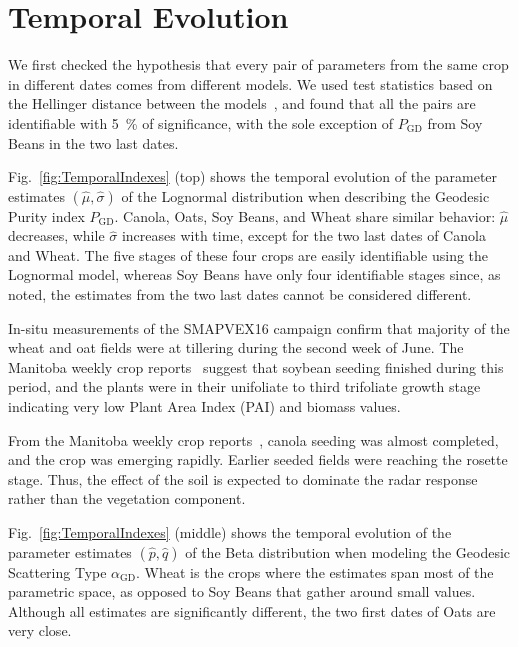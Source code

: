 \documentclass[journal]{IEEEtran}
\begin{document}
	\section{Temporal Evolution}
	
	We first checked the hypothesis that every pair of parameters from the same crop in different dates comes from different models.
	We used test statistics based on the Hellinger distance between the models~\cite{AnalyticExpressionsStochasticDistancesBetweenRelaxedComplexWishartDistributions}, and found that all the pairs are identifiable with \SI{5}{\percent} of significance, with the sole exception of $P_{\text{GD}}$ from Soy Beans in the two last dates.
	
	Fig.~\ref{fig:TemporalIndexes} (top) shows the temporal evolution of the parameter estimates $(\widehat\mu,\widehat\sigma)$ of the Lognormal distribution when describing the Geodesic Purity index $P_{\text{GD}}$.
	Canola, Oats, Soy Beans, and Wheat share similar behavior: $\widehat\mu$ decreases, while $\widehat\sigma$ increases with time, except for the two last dates of Canola and Wheat.
	The five stages of these four crops are easily identifiable using the Lognormal model, whereas Soy Beans have only four identifiable stages since, as noted, the estimates from the two last dates cannot be considered different.
	
	In-situ measurements of the SMAPVEX16 campaign confirm that majority of the wheat and oat fields were at tillering during the second week of June. The Manitoba weekly crop reports~\cite{manitobaagriculture} suggest that soybean seeding finished during this period, and the plants were in their unifoliate to third trifoliate growth stage indicating very low Plant Area Index (PAI) and biomass values.
	
	From the Manitoba weekly crop reports~\cite{manitobaagriculture}, canola seeding was almost completed, and the crop was emerging rapidly. 
	Earlier seeded fields were reaching the rosette stage. 
	Thus, the effect of the soil is expected to dominate the radar response rather than the vegetation component.
	
	Fig.~\ref{fig:TemporalIndexes} (middle) shows the temporal evolution of the parameter estimates $(\widehat p, \widehat q)$ of the Beta distribution when modeling the Geodesic Scattering Type $\alpha_{\text{GD}}$.
	Wheat is the crops where the estimates span most of the parametric space, as opposed to Soy Beans that gather around small values.
	Although all estimates are significantly different, the two first dates of Oats are very close.
	
\end{document}
